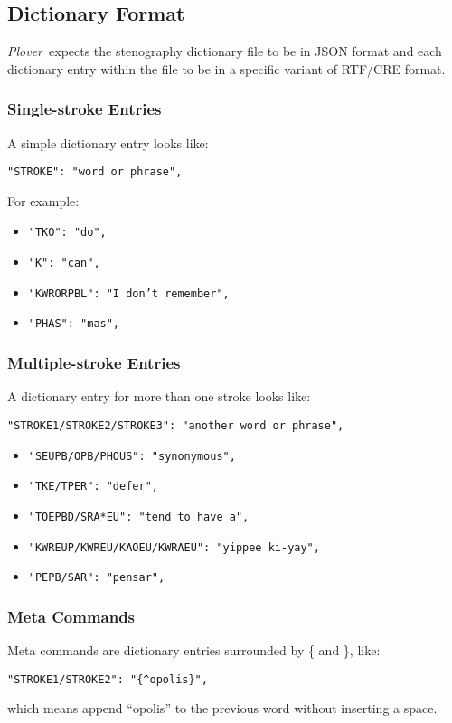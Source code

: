 \documentclass[11pt]{article}
\newcommand{\plover}{\emph{Plover}}
\newcommand{\code}[1]{\texttt{#1}}
\newcommand{\meta}[1]{\{#1\}}
\begin{document}
\subsection{Dictionary Format}
\plover~expects the stenography dictionary file to be in JSON format
and each dictionary entry within the file to be in a specific variant
of RTF/CRE format.

\subsubsection{Single-stroke Entries}
A simple dictionary entry looks like:

\code{"STROKE": "word or phrase",}

For example:
\begin{itemize}
\item \code{"TKO": "do",}
\item \code{"K": "can",}
\item \code{"KWRORPBL": "I don't remember",}
\item \code{"PHAS": "mas",}
\end{itemize}

\subsubsection{Multiple-stroke Entries}
A dictionary entry for more than one stroke looks like:

\code{"STROKE1/STROKE2/STROKE3": "another word or phrase",}

\begin{itemize}
\item \code{"SEUPB/OPB/PHOUS": "synonymous",}
\item \code{"TKE/TPER": "defer",}
\item \code{"TOEPBD/SRA*EU": "tend to have a",}
\item \code{"KWREUP/KWREU/KAOEU/KWRAEU": "yippee ki-yay",}
\item \code{"PEPB/SAR": "pensar",}
\end{itemize}

\subsubsection{Meta Commands}

Meta commands are dictionary entries surrounded by \{ and \}, like:

\code{"STROKE1/STROKE2": "\meta{\^{ }opolis}",}

which means append ``opolis'' to the previous word without inserting a
space.
\end{document}
